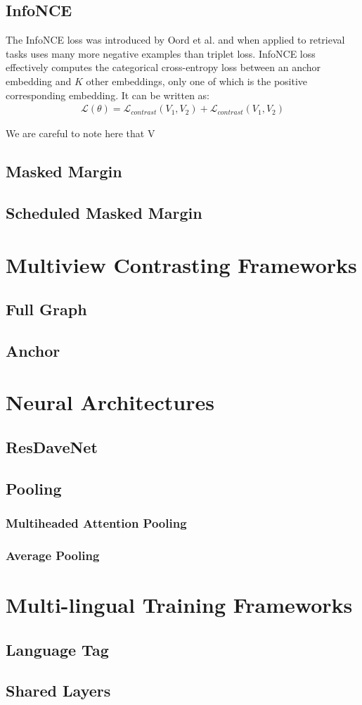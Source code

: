 \subsection{InfoNCE}
The InfoNCE loss was introduced by Oord et al. \cite{oord2018representation} and when applied to retrieval tasks uses many more negative examples than triplet loss.
InfoNCE loss effectively computes the categorical cross-entropy loss between an anchor embedding and $K$ other embeddings, only one of which is the positive corresponding embedding.
It can be written as:
\begin{align*}
\mathcal{L}(\theta) = \mathcal{L}_{contrast}(V_1, V_2)+ \mathcal{L}_{contrast}(V_1, V_2)
\end{align*}

We are careful to note here that V

\subsection{Masked Margin}
\subsection{Scheduled Masked Margin}
\section{Multiview Contrasting Frameworks}
\label{section:backg_contrast_framework}
\subsection{Full Graph}
\label{section:full_graph_framework}
\subsection{Anchor}
\label{section:anchor_framework}
\section{Neural Architectures}
\subsection{ResDaveNet}
\subsection{Pooling}
\subsubsection{Multiheaded Attention Pooling}
\subsubsection{Average Pooling}
\section{Multi-lingual Training Frameworks}
\subsection{Language Tag}
\subsection{Shared Layers}
